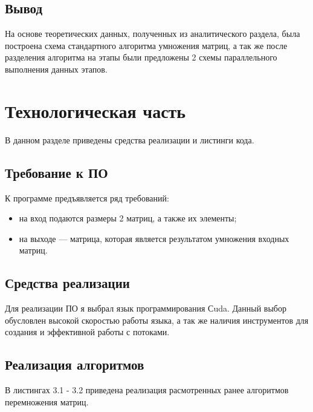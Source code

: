 \documentclass[12pt]{report}
\begin{document}
\section{Вывод}
На основе теоретических данных, полученных из аналитического раздела, была построена схема стандартного алгоритма умножения матриц, а так же после разделения алгоритма на этапы были предложены 2 схемы параллельного выполнения данных этапов.

\chapter{Технологическая часть}

В данном разделе приведены средства реализации и листинги кода.

\section{Требование к ПО}

К программе предъявляется ряд требований:

\begin{itemize}
	\item на вход подаются размеры 2 матриц, а также их элементы;
	\item на выходе — матрица, которая является результатом умножения входных матриц.
\end{itemize}

\section{Средства реализации}
Для реализации ПО я выбрал язык программирования Сuda. Данный выбор обусловлен высокой скоростью работы языка, а так же наличия инструментов для создания и эффективной работы с потоками.

\section{Реализация алгоритмов}

В листингах 3.1 - 3.2 приведена реализация расмотренных ранее алгоритмов перемножения матриц.
\end{document}
